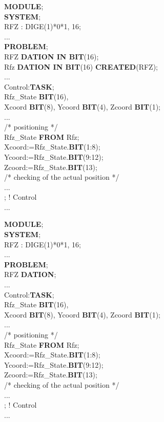 \begin{removed}
{\bf MODULE};\\
{\bf SYSTEM};\\
\x RFZ : DIGE(1)*0*1, 16;\\
\x ...\\
{\bf PROBLEM};\\
 RFZ {\bf DATION IN BIT}(16);\\
 Rfz {\bf DATION IN BIT}(16) {\bf CREATED}(RFZ);\\
\x ...\\
\x Control:{\bf TASK};\\
\x {} Rfz\_State {\bf BIT}(16),\\
\x \x \x Xcoord {\bf BIT}(8), Ycoord {\bf BIT}(4), Zcoord {\bf BIT}(1);\\
\x \x ...\\
\x \x \x /* positioning */ \\
\x {} Rfz\_State {\bf FROM} Rfz;\\
\x \x Xcoord:=Rfz\_State.{\bf BIT}(1:8);\\
\x \x Ycoord:=Rfz\_State.{\bf BIT}(9:12);\\
\x \x Zcoord:=Rfz\_State.{\bf BIT}(13);\\
\x \x \x /* checking of the actual position */ \\
\x \x ...\\
; ! Control\\
\x ...
\end{removed}

\begin{added}
{\bf MODULE};\\
{\bf SYSTEM};\\
\x RFZ : DIGE(1)*0*1, 16;\\
\x ...\\
{\bf PROBLEM};\\
 RFZ {\bf DATION};\\
\x ...\\
\x Control:{\bf TASK};\\
\x {} Rfz\_State {\bf BIT}(16),\\
\x \x \x Xcoord {\bf BIT}(8), Ycoord {\bf BIT}(4), Zcoord {\bf BIT}(1);\\
\x \x ...\\
\x \x \x /* positioning */ \\
\x {} Rfz\_State {\bf FROM} Rfz;\\
\x \x Xcoord:=Rfz\_State.{\bf BIT}(1:8);\\
\x \x Ycoord:=Rfz\_State.{\bf BIT}(9:12);\\
\x \x Zcoord:=Rfz\_State.{\bf BIT}(13);\\
\x \x \x /* checking of the actual position */ \\
\x \x ...\\
; ! Control\\
\x ...
\end{added}



